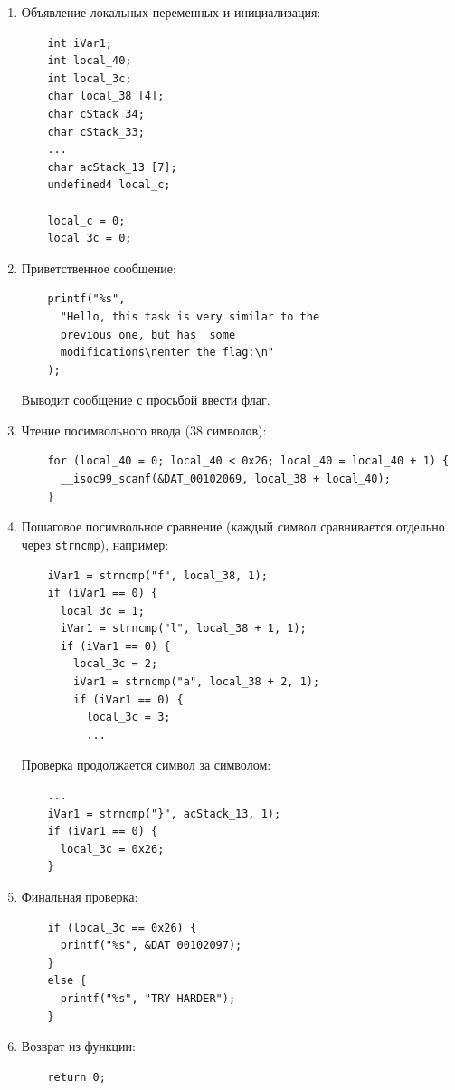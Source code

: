     \begin{enumerate}
        \item Объявление локальных переменных и инициализация:
        \begin{verbatim}
    int iVar1;
    int local_40;
    int local_3c;
    char local_38 [4];
    char cStack_34;
    char cStack_33;
    ...
    char acStack_13 [7];
    undefined4 local_c;
    
    local_c = 0;
    local_3c = 0;
        \end{verbatim}

        \item Приветственное сообщение:
        \begin{verbatim}
    printf("%s",
      "Hello, this task is very similar to the
      previous one, but has  some
      modifications\nenter the flag:\n"
    );
        \end{verbatim}
        Выводит сообщение с просьбой ввести флаг.

        \item Чтение посимвольного ввода (38 символов):
        \begin{verbatim}
    for (local_40 = 0; local_40 < 0x26; local_40 = local_40 + 1) {
      __isoc99_scanf(&DAT_00102069, local_38 + local_40);
    }
        \end{verbatim}

        \item Пошаговое посимвольное сравнение (каждый символ сравнивается отдельно через \texttt{strncmp}), например:
        \begin{verbatim}
    iVar1 = strncmp("f", local_38, 1);
    if (iVar1 == 0) {
      local_3c = 1;
      iVar1 = strncmp("l", local_38 + 1, 1);
      if (iVar1 == 0) {
        local_3c = 2;
        iVar1 = strncmp("a", local_38 + 2, 1);
        if (iVar1 == 0) {
          local_3c = 3;
          ...
        \end{verbatim}

        Проверка продолжается символ за символом:
        \begin{verbatim}
    ...
    iVar1 = strncmp("}", acStack_13, 1);
    if (iVar1 == 0) {
      local_3c = 0x26;
    }
        \end{verbatim}

        \item Финальная проверка:
        \begin{verbatim}
    if (local_3c == 0x26) {
      printf("%s", &DAT_00102097);
    }
    else {
      printf("%s", "TRY HARDER");
    }
        \end{verbatim}

        \item Возврат из функции:
        \begin{verbatim}
    return 0;
        \end{verbatim}
    \end{enumerate}

